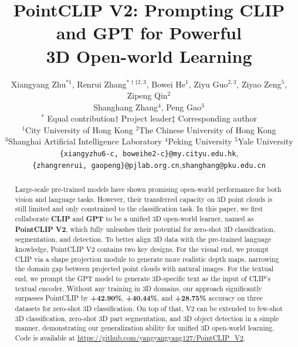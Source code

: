 \documentclass[10pt,twocolumn,letterpaper]{article}
\begin{document}
\title{PointCLIP V2: Prompting CLIP and GPT for Powerful\\3D Open-world Learning}

\author{Xiangyang Zhu$^{*1}$, Renrui Zhang$^{*\dagger\ddagger2,3}$, Bowei He$^{1}$, Ziyu Guo$^{2,3}$, Ziyao Zeng$^{5}$, Zipeng Qin$^{2}$\\\vspace{0.2cm} Shanghang Zhang$^{4}$, Peng Gao$^{3}$\\
\normalsize{$^*$ Equal contribution}\quad  $\dagger$ Project leader\quad  $\ddagger$ Corresponding author\vspace{0.3cm}\\
  $^1$City University of Hong Kong \quad \vspace{0.07cm}
  $^2$The Chinese University of Hong Kong\\
  $^3$Shanghai Artificial Intelligence Laboratory \quad
  $^4$Peking University\quad
  $^5$Yale University\vspace{0.2cm}\\
\texttt{\{xiangyzhu6-c, boweihe2-c\}@my.cityu.edu.hk},\\
\texttt{\{zhangrenrui, gaopeng\}@pjlab.org.cn},\quad \texttt{shanghang@pku.edu.cn}
}

\maketitle

\ificcvfinal\thispagestyle{empty}\fi

\begin{abstract}
Large-scale pre-trained models have shown promising open-world performance for both vision and language tasks. However, their transferred capacity on 3D point clouds is still limited and only constrained to the classification task. In this paper, we first collaborate \textbf{CLIP} and \textbf{GPT} to be a unified 3D open-world learner, named as \textbf{PointCLIP V2}, which fully unleashes their potential for zero-shot 3D classification, segmentation, and detection. To better align 3D data with the pre-trained language knowledge, PointCLIP V2 contains two key designs.
For the visual end, we prompt CLIP via a shape projection module to generate more realistic depth maps, narrowing the domain gap between projected point clouds with natural images. For the textual end, we prompt the GPT model to generate 3D-specific text as the input of CLIP's textual encoder. 
Without any training in 3D domains, our approach significantly surpasses PointCLIP by \textbf{+42.90\%}, \textbf{+40.44\%}, and \textbf{+28.75\%} accuracy on three datasets for zero-shot 3D classification.
On top of that, V2 can be extended to few-shot 3D classification, zero-shot 3D part segmentation, and 3D object detection in a simple manner, demonstrating our generalization ability for unified 3D open-world learning. 
Code is available at \url{https://github.com/yangyangyang127/PointCLIP_V2}.
\end{abstract}
\end{document}
